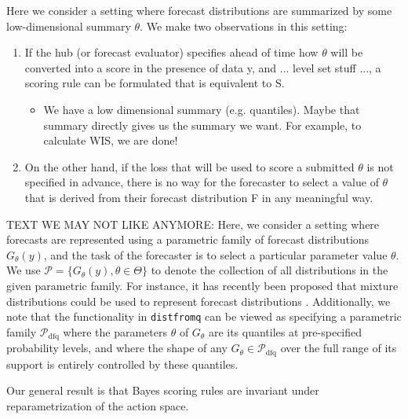 \documentclass{article}
\begin{document}
Here we consider a setting where forecast distributions are summarized by some low-dimensional summary $\theta$. We make two observations in this setting:
\begin{enumerate}
  \item If the hub (or forecast evaluator) specifies ahead of time how $\theta$ will be converted into a score in the presence of data y, and ... level set stuff ..., a scoring rule can be formulated that is equivalent to S. 
  \begin{itemize}
    \item We have a low dimensional summary (e.g. quantiles).  Maybe that summary directly gives us the summary we want. For example, to calculate WIS, we are done!
  \end{itemize}
  \item On the other hand, if the loss that will be used to score a submitted $\theta$ is not specified in advance, there is no way for the forecaster to select a value of $\theta$ that is derived from their forecast distribution F in any meaningful way.
\end{enumerate}



TEXT WE MAY NOT LIKE ANYMORE:
Here, we consider a setting where forecasts are represented using a parametric family of forecast distributions $G_\theta(y)$, and the task of the forecaster is to select a particular parameter value $\theta$. We use $\mathcal{P} = \{G_\theta(y), \theta \in \Theta \}$ to denote the collection of all distributions in the given parametric family. For instance, it has recently been proposed that mixture distributions could be used to represent forecast distributions \cite{wadsworth2023mixture}. Additionally, we note that the functionality in \verb`distfromq` can be viewed as specifying a parametric family $\mathcal{P}_{\mathrm{dfq}}$ where the parameters $\theta$ of $G_\theta$
are its quantiles at pre-specified probability levels, and where the shape of any $G_\theta \in \mathcal{P}_{\mathrm{dfq}}$ over the full range of its support is entirely controlled by these quantiles.

Our general result is that Bayes scoring rules are invariant under reparametrization of the action space.
\end{document}
